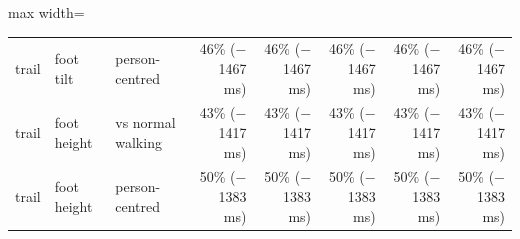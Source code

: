 \begin{adjustbox}{max width=\textwidth}
{\begin{tabular}{lllrrrrr}
trail & foot tilt & person-centred & 46\% ($-$1467 ms) & 46\% ($-$1467 ms) & 46\% ($-$1467 ms) & 46\% ($-$1467 ms) & 46\% ($-$1467 ms) \\
trail & foot height & vs normal walking & 43\% ($-$1417 ms) & 43\% ($-$1417 ms) & 43\% ($-$1417 ms) & 43\% ($-$1417 ms) & 43\% ($-$1417 ms) \\
trail & foot height & person-centred & 50\% ($-$1383 ms) & 50\% ($-$1383 ms) & 50\% ($-$1383 ms) & 50\% ($-$1383 ms) & 50\% ($-$1383 ms) \\
\bottomrule
\end{tabular}
}
\end{adjustbox}
